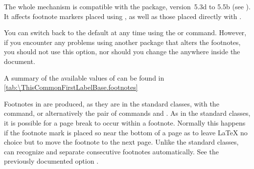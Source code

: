 The whole mechanism is compatible with the 
package, version~5.3d to 5.5b (see \cite{package:footmisc}). It affects
footnote markers placed using 
, as well as 
those placed directly with 
.

You can switch back to the default 
 at any time using the 
 or
 command. However, if you
encounter any problems using another package that alters the footnotes, you
should not use this option, nor should you change the  anywhere
inside the document.

A summary of the available  values of  can
be found in \autoref{tab:\ThisCommonFirstLabelBase.footnotes}%
%
%
\EndIndexGroup


\begin{Declaration}
\end{Declaration}%
Footnotes in \KOMAScript{} are produced, as they are in the standard classes,
with the  command, or alternatively the pair of commands
 and . As in the standard classes,
it is possible for a page break to occur within a footnote. Normally this
happens if the footnote mark is placed so near the bottom of a page as to
leave \LaTeX{} no choice but to move the footnote to the next page.
Unlike
the standard classes, \KOMAScript{} can recognize and separate consecutive
footnotes automatically. 
See the previously
documented option .

